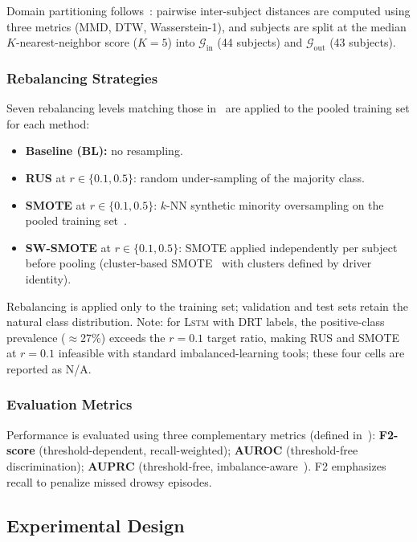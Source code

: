 \documentclass[lettersize,journal]{IEEEtran}
\newcommand{\Impl}[1]{\textsc{#1}}
\begin{document}
Domain partitioning follows~\cite{nakagama2026tiv}: pairwise inter-subject distances are computed using three metrics (MMD, DTW, Wasserstein-1), and subjects are split at the median $K$-nearest-neighbor score ($K = 5$) into $\mathcal{G}_{\mathrm{in}}$ (44 subjects) and $\mathcal{G}_{\mathrm{out}}$ (43 subjects).

\subsubsection{Rebalancing Strategies}
\label{sec:rebalancing}
Seven rebalancing levels matching those in~\cite{nakagama2026tiv} are applied to the pooled training set for each method:
\begin{itemize}
\item \textbf{Baseline (BL):} no resampling.
\item \textbf{RUS} at $r \in \{0.1, 0.5\}$: random under-sampling of the majority class.
\item \textbf{SMOTE} at $r \in \{0.1, 0.5\}$: $k$-NN synthetic minority oversampling on the pooled training set~\cite{chawla2002}.
\item \textbf{SW-SMOTE} at $r \in \{0.1, 0.5\}$: SMOTE applied independently per subject before pooling (cluster-based SMOTE~\cite{douzas2018} with clusters defined by driver identity).
\end{itemize}
Rebalancing is applied only to the training set; validation and test sets retain the natural class distribution.
Note: for \Impl{Lstm} with DRT labels, the positive-class prevalence ($\approx$27\%) exceeds the $r = 0.1$ target ratio, making RUS and SMOTE at $r = 0.1$ infeasible with standard imbalanced-learning tools; these four cells are reported as N/A.

\subsubsection{Evaluation Metrics}
\label{sec:metrics}
Performance is evaluated using three complementary metrics (defined in~\cite{nakagama2026tiv}):
\textbf{F2-score} (threshold-dependent, recall-weighted);
\textbf{AUROC} (threshold-free discrimination);
\textbf{AUPRC} (threshold-free, imbalance-aware~\cite{saito2015}).
F2 emphasizes recall to penalize missed drowsy episodes.

\subsection{Experimental Design}
\label{sec:design}
\end{document}
